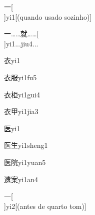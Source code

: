\begin{verbete}[1]{一}[\\]{yi1}[(quando usado sozinho)]
\end{verbete}

\begin{verbete}[1;8]{一……就……}[\\]{yi1...jiu4...}
\end{verbete}

\begin{verbete}[6]{衣}{yi1}
\end{verbete}

\begin{verbete}[6;8]{衣服}{yi1fu5}
\end{verbete}

\begin{verbete}[6;8]{衣柜}{yi1gui4}
\end{verbete}

\begin{verbete}[6;5]{衣甲}{yi1jia3}
\end{verbete}

\begin{verbete}[7]{医}{yi1}
\end{verbete}

\begin{verbete}[7;5]{医生}{yi1sheng1}
\end{verbete}

\begin{verbete}[7;9]{医院}{yi1yuan5}
\end{verbete}

\begin{verbete}[7;10]{遗案}{yi1an4}
\end{verbete}

\begin{verbete}[1]{一}[\\]{yi2}[(antes de quarto tom)]
\end{verbete}

